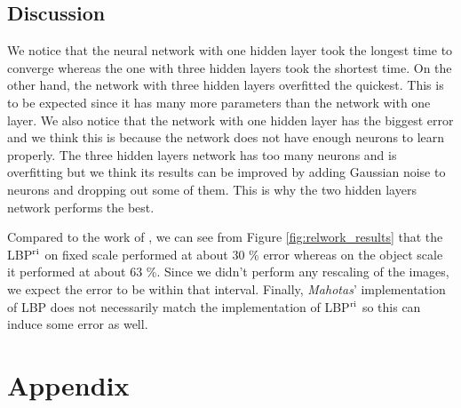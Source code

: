 \begin{multicols}{2}
\subsection{Discussion}
We notice that the neural network with one hidden layer took the longest time to converge whereas the one with three hidden layers took the shortest time. On the other hand, the network with three hidden layers overfitted the quickest. This is to be expected since it has many more parameters than the network with one layer. We also notice that the network with one hidden layer has the biggest error and we think this is because the network does not have enough neurons to learn properly. The three hidden layers network has too many neurons and is overfitting but we think its results can be improved by adding Gaussian noise to neurons and dropping out some of them. This is why the two hidden layers network performs the best. 
\par Compared to the work of \citet{kylberg2011virus}, we can see from Figure \ref{fig:relwork_results} that the LBP$^{\textnormal{ri}}$ on fixed scale performed at about 30 \% error whereas on the object scale it performed at about 63 \%. Since we didn't perform any rescaling of the images, we expect the error to be within that interval. Finally, \emph{Mahotas}' implementation of LBP does not necessarily match the implementation of LBP$^{\textnormal{ri}}$ so this can induce some error as well. 
\end{multicols}

\newpage
\section*{Appendix}
\appendix
